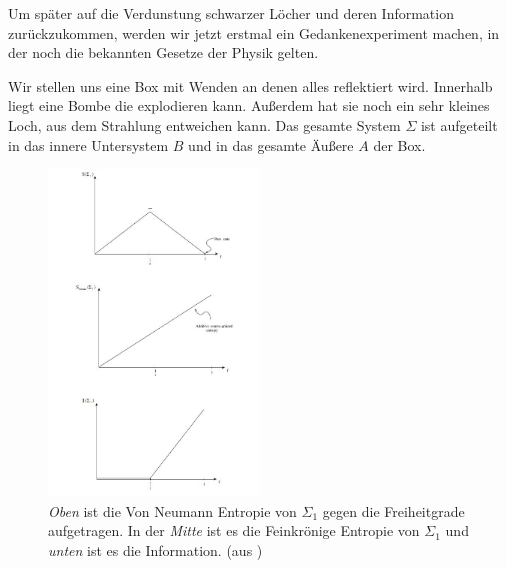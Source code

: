 \documentclass[ngerman]{scrartcl}
\begin{document}
Um später auf die Verdunstung schwarzer Löcher und deren Information zurückzukommen, werden wir jetzt erstmal ein Gedankenexperiment machen, in der noch die bekannten Gesetze der Physik gelten.

Wir stellen uns eine Box mit Wenden an denen alles reflektiert wird. Innerhalb liegt eine Bombe die explodieren kann. Außerdem hat sie noch ein sehr kleines Loch, aus dem Strahlung entweichen kann.
Das gesamte System $\Sigma$ ist aufgeteilt in das innere Untersystem $B$ und in das gesamte Äußere $A$ der Box. 
\begin{figure} [!b]
	\begin{center}
		\includegraphics[width=0.5\textwidth]{Box}
	\end{center}
	\caption{\textit{Oben} ist die Von Neumann Entropie von $\Sigma_1$ gegen die Freiheitgrade aufgetragen. In der \textit{Mitte} ist es die Feinkrönige Entropie von $\Sigma_1$ und \textit{unten} ist es die Information. (aus \cite{Revolution})}
\end{figure}
\end{document}
